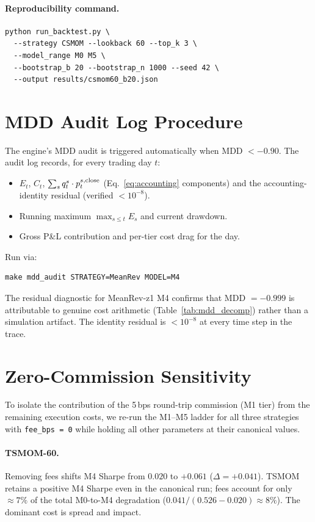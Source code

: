 \documentclass[12pt]{article}
\begin{document}
\paragraph{Reproducibility command.}
\begin{verbatim}
python run_backtest.py \
  --strategy CSMOM --lookback 60 --top_k 3 \
  --model_range M0 M5 \
  --bootstrap_b 20 --bootstrap_n 1000 --seed 42 \
  --output results/csmom60_b20.json
\end{verbatim}

\section{MDD Audit Log Procedure}
\label{app:mdd_audit}

The engine's MDD audit is triggered automatically when MDD $< -0.90$.
The audit log records, for every trading day $t$:
\begin{itemize}[nosep]
  \item $E_t$, $C_t$, $\sum_s q^s_t \cdot p^{s,\rm close}_t$
    (Eq.~\ref{eq:accounting} components) and the accounting-identity
    residual (verified $< 10^{-8}$).
  \item Running maximum $\max_{s \le t} E_s$ and current drawdown.
  \item Gross P\&L contribution and per-tier cost drag for the day.
\end{itemize}

Run via:
\begin{verbatim}
make mdd_audit STRATEGY=MeanRev MODEL=M4
\end{verbatim}
The residual diagnostic for MeanRev-z1 M4 confirms that MDD $= -0.999$
is attributable to genuine cost arithmetic (Table~\ref{tab:mdd_decomp})
rather than a simulation artifact. The identity residual is
$< 10^{-8}$ at every time step in the trace.

\section{Zero-Commission Sensitivity}
\label{app:zero_commission}

To isolate the contribution of the 5\,bps round-trip commission (M1
tier) from the remaining execution costs, we re-run the M1--M5 ladder
for all three strategies with \texttt{fee\_bps\,=\,0} while holding
all other parameters at their canonical values.

\paragraph{TSMOM-60.}
Removing fees shifts M4 Sharpe from $0.020$ to $+0.061$
($\Delta = +0.041$). TSMOM retains a positive M4 Sharpe even in the
canonical run; fees account for only $\approx 7\%$ of the total
M0-to-M4 degradation ($0.041 / (0.526 - 0.020) \approx 8\%$).
The dominant cost is spread and impact.
\end{document}
